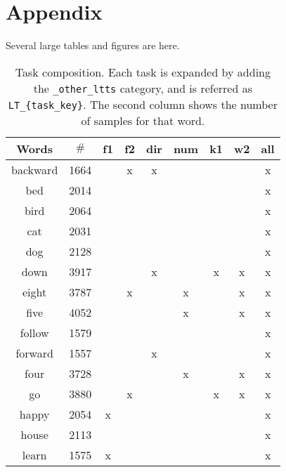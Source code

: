 \section{Appendix}
\label{sec:appendix}

Several large tables and figures are here.


\begin{table}[h!]
    \centering
    \caption{Task composition.
    Each task is expanded by adding the
    \texttt{\_other\_ltts}
    category,
    and is referred as
    \texttt{LT\_\{task\_key\}}.
    The second column shows the number of samples for that word.
    }
    \label{tab:task_word_composition}
    \begin{tabular}{|c|c|ccccccc|}
        \hline
        Words & $\#$          &f1 &f2 &dir&num&k1 &w2 &all \\
        \hline
        backward & 1664       &   & x & x &   &   &   & x  \\
        bed & 2014            &   &   &   &   &   &   & x  \\
        bird & 2064           &   &   &   &   &   &   & x  \\
        cat & 2031            &   &   &   &   &   &   & x  \\
        \hline
        dog & 2128            &   &   &   &   &   &   & x  \\
        down & 3917           &   &   & x &   & x & x & x  \\
        eight & 3787          &   & x &   & x &   & x & x  \\
        five & 4052           &   &   &   & x &   & x & x  \\
        \hline
        follow & 1579         &   &   &   &   &   &   & x  \\
        forward & 1557        &   &   & x &   &   &   & x  \\
        four & 3728           &   &   &   & x &   & x & x  \\
        go & 3880             &   & x &   &   & x & x & x  \\
        \hline
        happy & 2054          & x &   &   &   &   &   & x  \\
        house & 2113          &   &   &   &   &   &   & x  \\
        learn & 1575          & x &   &   &   &   &   & x  \\

\end{tabular}
\end{table}

